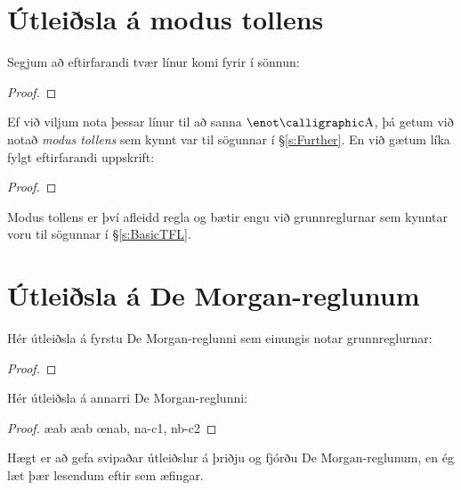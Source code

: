 \section{Útleiðsla á modus tollens}
Segjum að eftirfarandi tvær línur komi fyrir í sönnun:
\begin{proof}
\end{proof}
Ef við viljum nota þessar línur til að sanna $\enot \meta{A}$, þá getum við notað \emph{modus tollens} sem kynnt var til sögunnar í \S\ref{s:Further}. En við gætum líka fylgt eftirfarandi uppskrift:
\begin{proof}
		\open
		\close
\end{proof}
Modus tollens er því afleidd regla og bætir engu við grunnreglurnar sem kynntar voru til sögunnar í \S\ref{s:BasicTFL}.

\section{Útleiðsla á De Morgan-reglunum}
Hér útleiðsla á fyrstu De Morgan-reglunni sem einungis notar grunnreglurnar:
 	\begin{proof}
		\open
			\open
			\close
		\close
		\open
		\close
	\end{proof}
Hér útleiðsla á annarri De Morgan-reglunni:
 	\begin{proof}
		\open
			\ae{ab}
			\ae{ab}
			\open
			\close
			\open
			\close
			\oe{nab, na-c1, nb-c2}
		\close
	\end{proof}
Hægt er að gefa svipaðar útleiðslur á þriðju og fjórðu De Morgan-reglunum, en ég læt þær lesendum eftir sem æfingar.	

